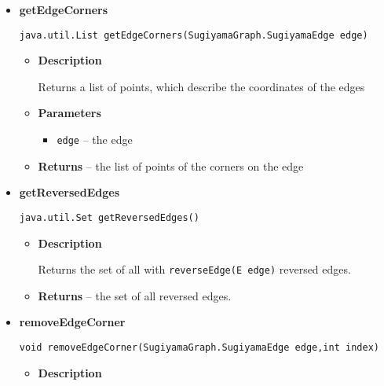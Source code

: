 {{{{{{{{{\begin{itemize}
{\begin{itemize}
{Adds a new edge corner to the specified edge. The index specifies the position between other edge corners. Every edge corner is connected with the corners with index +/- 1 of it's index. Counting starts at 0 at the endpoint at the source vertex of the edge. End- and startpoint are also counted as corners
}
\item{
{\bf  Parameters}
  \begin{itemize}
   \item{
\texttt{edge} -- the edge to add a new corner}
   \item{
\texttt{x} -- the x coordinate of the corner}
   \item{
\texttt{y} -- the y coordinate of the corner}
   \item{
\texttt{index} -- the index on the edge of the corner}
  \end{itemize}
}%
\end{itemize}
}%
\item{ 
{\bf  getEdgeCorners}\\
\begin{lstlisting}[frame=none]
java.util.List getEdgeCorners(SugiyamaGraph.SugiyamaEdge edge)\end{lstlisting} %
\begin{itemize}
\item{
{\bf  Description}

Returns a list of points, which describe the coordinates of the edges
}
\item{
{\bf  Parameters}
  \begin{itemize}
   \item{
\texttt{edge} -- the edge}
  \end{itemize}
}%
\item{{\bf  Returns} -- 
the list of points of the corners on the edge 
}%
\end{itemize}
}%
\item{ 
{\bf  getReversedEdges}\\
\begin{lstlisting}[frame=none]
java.util.Set getReversedEdges()\end{lstlisting} %
\begin{itemize}
\item{
{\bf  Description}

Returns the set of all with \texttt{\small reverseEdge(E edge)} reversed edges.
}
\item{{\bf  Returns} -- 
the set of all reversed edges. 
}%
\end{itemize}
}%
\item{ 
{\bf  removeEdgeCorner}\\
\begin{lstlisting}[frame=none]
void removeEdgeCorner(SugiyamaGraph.SugiyamaEdge edge,int index)\end{lstlisting} %
\begin{itemize}
\item{
{\bf  Description}

}
\end{itemize}}
\end{itemize}}}}}}}}}}
